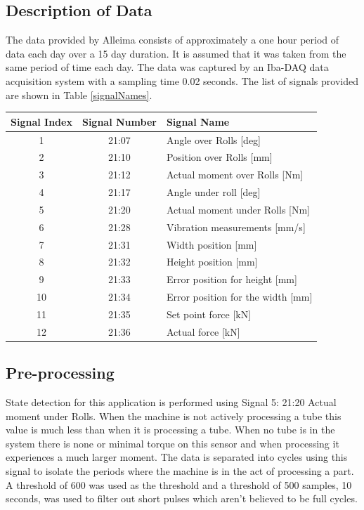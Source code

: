 \documentclass[]{article}
\begin{document}
\subsection{Description of Data}
The data provided by Alleima consists of approximately a one hour period of data each day over a 15 day duration. It is assumed that it was taken from the same period of time each day. The data was captured by an Iba-DAQ data acquisition system with a sampling time 0.02 seconds. The list of signals provided are shown in Table \ref{signalNames}.
\begin{center}
\label{signalNames}
\begin{tabular}{ |c|c|l| }
 \hline
Signal Index & Signal Number & Signal Name \\ 
 \hline
1 & 21:07 & Angle over Rolls [deg] \\
 \hline
2 & 21:10 & Position over Rolls [mm] \\
 \hline
3 & 21:12 & Actual moment over Rolls [Nm] \\
 \hline
4 & 21:17 & Angle under roll [deg] \\
 \hline
5 & 21:20 & Actual moment under Rolls [Nm] \\
 \hline
6 & 21:28 & Vibration measurements [mm/s] \\ 
 \hline              
7 & 21:31 & Width position [mm] \\
 \hline
8 & 21:32 & Height position [mm] \\
 \hline
9 & 21:33 & Error position for height [mm] \\
 \hline
10 & 21:34 & Error position for the width [mm] \\
 \hline
11 & 21:35 & Set point force [kN] \\
 \hline
12 & 21:36 & Actual force [kN] \\
 \hline
\end{tabular}
\end{center}

\subsection{Pre-processing}
State detection for this application is performed using Signal 5: 21:20 Actual moment under Rolls. When the machine is not actively processing a tube this value is much less than when it is processing a tube. When no tube is in the system there is none or minimal torque on this sensor and when processing it experiences a much larger moment.
The data is separated into cycles using this signal to isolate the periods where the machine is in the act of processing a part. A threshold of 600 was used as the threshold and a threshold of 500 samples, 10 seconds, was used to filter out short pulses which aren't believed to be full cycles.
\end{document}
